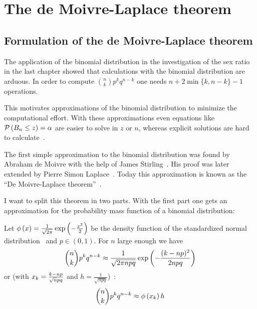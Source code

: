 \chapter{The de Moivre-Laplace theorem}

\section{Formulation of the de Moivre-Laplace theorem}


The application of the binomial distribution in the investigation of the sex ratio in the last chapter showed that calculations with the binomial distribution are arduous. In order to compute $\binom nk p^kq^{n-k}$ one needs $n+2\min\{k,n-k\}-1$ operations.

This motivates approximations of the binomial distribution to minimize the computational effort. With these approximations even equations like $\mathcal P\left({B_{n} \le z}\right)=\alpha$ are easier to solve in $z$ or $n$, whereas explicit solutions are hard to calculate~\cite[p. 469]{hald1}.

The first simple approximation to the binomial distribution was found by Abraham de Moivre with the help of James Stirling~\cite[p. 469]{hald1}. His proof was later extended by Pierre Simon Laplace~\cite[pp. 495 ff.]{hald1}. Today this approximation is known as the ``De Moivre-Laplace theorem''~\cite[pp. 64-67]{irle}.

I want to split this theorem in two parts. With the first part one gets an approximation for the probability mass function of a binomial distribution:

\begin{theorem}
  Let $\phi\left( {x} \right)=\frac{1}{\sqrt{2\pi}}\exp\left( {-\frac{x^2}2} \right)$ be the density function of the standardized normal distribution~\cite[p. 48]{georgii} and $p\in(0,1)$. For $n$ large enough we have~\cite[p. 65]{irle}
  \begin{align}
    \binom nk p^k q^{n-k} \approx \frac 1{\sqrt{2\pi npq}} \exp\left( {-\frac{(k-np)^2}{2npq}} \right)
  \end{align}
  or (with $x_{k}=\frac{k-np}{\sqrt npq}$ and $h=\frac1{\sqrt{npq}}$)~\cite[p. 133]{georgii}:
  \begin{align}
    \binom nk p^k q^{n-k} \approx \phi\left( {x_{k}} \right) h
  \end{align}
\end{theorem}

